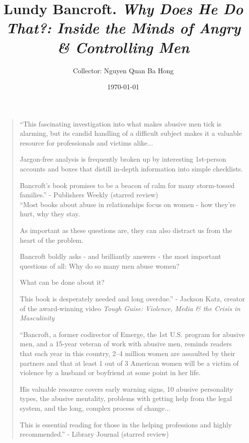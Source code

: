 \documentclass[oneside]{article}
\title{Lundy Bancroft. \textit{Why Does He Do That?: Inside the Minds of Angry \& Controlling Men}}
\author{Collector: Nguyen Quan Ba Hong}
\date{\today}
\numberwithin{equation}{section}
\begin{document}
\maketitle
\setcounter{secnumdepth}{6}
\setcounter{tocdepth}{6}
\tableofcontents


\begin{quotation}
    ``This fascinating investigation into what makes abusive men tick is alarming, but its candid handling of a difficult subject makes it a valuable resource for professionals and victims alike$\ldots$
    
    Jargon-free analysis is frequently broken up by interesting 1st-person accounts and boxes that distill in-depth information into simple checklists.
    
    Bancroft's book promises to be a beacon of calm for many storm-tossed families.'' - Publishers Weekly (starred review)
    \\
    
    ``Most books about abuse in relationships focus on women - how they're hurt, why they stay.
    
    As important as these questions are, they can also distract us from the heart of the problem.
    
    Bancroft boldly asks - and brilliantly answers - the most important questions of all: Why do so many men abuse women?
    
    What can be done about it?
    
    This book is desperately needed and long overdue.'' - Jackson Katz, creator of the award-winning video \textit{Tough Guise: Violence, Media \& the Crisis in Masculinity}
    
    ``Bancroft, a former codirector of Emerge, the 1st U.S. program for abusive men, and a 15-year veteran of work with abusive men, reminds readers that each year in this country, 2--4 million women are assaulted by their partners and that at least 1 out of 3 American women will be a victim of violence by a husband or boyfriend at some point in her life.
    
    His valuable resource covers early warning signs, 10 abusive personality types, the abusive mentality, problems with getting help from the legal system, and the long, complex process of change$\ldots$
    
    This is essential reading for those in the helping professions and highly recommended.'' - Library Journal (starred review)
    

\end{quotation}
\end{document}
